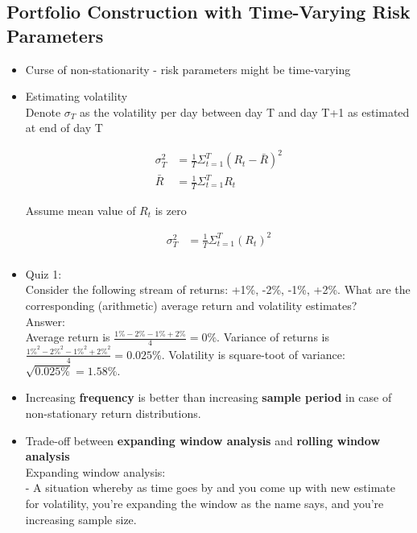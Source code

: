 \documentclass{maths}
\begin{document}
\subsection{Portfolio Construction with Time-Varying Risk Parameters} 
\begin{itemize}
\item Curse of non-stationarity - risk parameters might be time-varying\\

\item Estimating volatility\\

Denote $\sigma_T$ as the volatility per day between day T and day T+1 as estimated at end of day T

\begin{align*}
\sigma_T^2 &= \frac{1}{T}\Sigma_{t=1}^T(R_t - \bar{R})^2\\
\bar{R} &=\frac{1}{T}\Sigma_{t=1}^TR_t 
\end{align*}

Assume mean value of $R_t$ is zero

\begin{align*}
\sigma_T^2 &= \frac{1}{T}\Sigma_{t=1}^T(R_t)^2\\
\end{align*}


\item Quiz 1:\\
Consider the following stream of returns: +1\%, -2\%, -1\%, +2\%. What are the corresponding (arithmetic) average return and volatility estimates? \\

Answer:\\
Average return is $\frac{1\%-2\%-1\%+2\%}{4}=0\%$. Variance of returns is $\frac{1\%^2-2\%^2-1\%^2+2\%^2}{4}=0.025\%$. Volatility is square-toot of variance: $\sqrt{0.025\%} =1.58\%$.\\

\item Increasing \textbf{frequency} is better than increasing \textbf{sample period} in case of non-stationary return distributions.\\

\item Trade-off between \textbf{expanding window analysis} and \textbf{rolling window analysis}\\

Expanding window analysis:\\
- A situation whereby as time goes by and you come up with new estimate for volatility, you're expanding the window as the name says, and you're increasing sample size.


\end{itemize}
\end{document}
